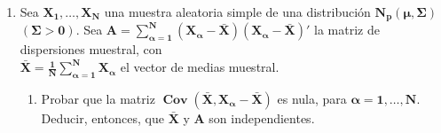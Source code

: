 \documentclass[11pt,a4paper]{article}
\begin{document}
\begin{enumerate}[label=\arabic*.]
\newpage
\bfseries
\item Sea $\mathbf{X_{1}, \dots, X_{N}}$ una muestra aleatoria simple de una distribución $\mathbf{N_{p}(\mu, \Sigma)}$ $\mathbf{(\Sigma > 0)}$. Sea $\mathbf{A = \sum_{\alpha=1}^{N} (X_{\alpha}-\bar{X})(X_{\alpha}-\bar{X})'}$ la matriz de dispersiones muestral, con \\ $\mathbf{\bar{X} = \frac{1}{N} \sum_{\alpha=1}^{N} X_{\alpha}}$ el vector de medias muestral.

\vspace{1cm}
\begin{enumerate}[label=(\alph*)]
\item Probar que la matriz $\mathbf{\operatorname{Cov}(\bar{X}, X_{\alpha}-\bar{X})}$ es nula, para $\mathbf{\alpha=1,\dots,N}$. Deducir, entonces, que $\mathbf{\bar{X}}$ y $\mathbf{A}$ son independientes.

\vspace{0.5cm}
\normalfont


\end{enumerate}
\end{enumerate}
\end{document}
